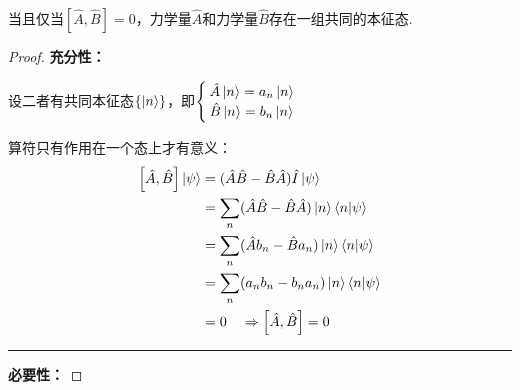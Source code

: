 \begin{proposition}
    当且仅当$[\hat{A},\hat{B}]=0$，力学量$\hat{A}$和力学量$\hat{B}$存在一组共同的本征态.
\end{proposition}
\begin{proof}
    \textbf{充分性：}

    设二者有共同本征态$\{\ket{n}\}$，即$\begin{cases} \hat{A}\ket{n} = a_n\ket{n} \\ \hat{B}\ket{n} = b_n\ket{n} \end{cases}$

    算符只有作用在一个态上才有意义：
    \begin{align*}
        \comm{\hat{A}}{\hat{B}}\ket{\psi} &= (\hat{A}\hat{B} - \hat{B}\hat{A})\hat{I}\ket{\psi} \\
        &= \sum_{n} (\hat{A}\hat{B} - \hat{B}\hat{A})\ket{n}\bra{n}\ket{\psi} \\
        &= \sum_{n} (\hat{A}b_n - \hat{B}a_n)\ket{n}\bra{n}\ket{\psi} \\
        &= \sum_{n} (a_n b_n - b_n a_n)\ket{n}\bra{n}\ket{\psi} \\
        &= 0 \quad \Rightarrow \comm{\hat{A}}{\hat{B}} = 0
    \end{align*}
    \rule{\textwidth}{0.4pt}
    \textbf{必要性：}


\end{proof}

